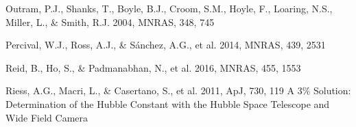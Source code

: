 \documentclass[iop]{emulateapj}
\begin{document}
\begin{thebibliography}{}

Outram, P.J., Shanks, T., Boyle, B.J., Croom, S.M., Hoyle, F., Loaring, N.S., 
Miller, L., \& Smith, R.J. 2004, MNRAS, 348, 745  









Percival, W.J., Ross, A.J., \& S\'{a}nchez, A.G., et al. 2014, MNRAS, 439, 2531






Reid, B., Ho, S., \& Padmanabhan, N., et al.  2016, MNRAS, 455, 1553


Riess, A.G., Macri, L., \& Casertano, S., et al. 2011, ApJ, 730, 119
A 3\% Solution: Determination of the Hubble Constant with the Hubble Space Telescope and Wide Field Camera


\end{thebibliography}
\end{document}
